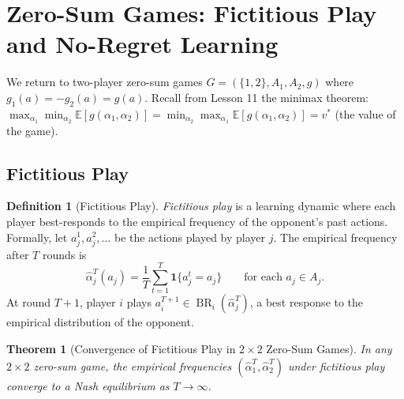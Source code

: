 \documentclass[11pt,a4paper]{article}
\theoremstyle{definition}
\newtheorem{definition}{Definition}[section]
\theoremstyle{plain}
\newtheorem{theorem}{Theorem}[section]
\theoremstyle{remark}
\newcommand{\E}{\mathbb{E}}
\newcommand{\indicator}{\mathbf{1}}
\DeclareMathOperator{\BR}{BR}
\begin{document}
\section{Zero-Sum Games: Fictitious Play and No-Regret Learning}
\label{sec:zero-sum}

We return to two-player zero-sum games $G = (\{1,2\}, A_1, A_2, g)$ where
$g_1(a) = -g_2(a) = g(a)$. Recall from Lesson 11 the minimax theorem:
$\max_{\alpha_1} \min_{\alpha_2} \E[g(\alpha_1, \alpha_2)]
= \min_{\alpha_2} \max_{\alpha_1} \E[g(\alpha_1, \alpha_2)] = v^*$ (the value of the game).

\subsection{Fictitious Play}

\begin{definition}[Fictitious Play]
\label{def:fictitious-play}
\emph{Fictitious play} is a learning dynamic where each player best-responds to the
empirical frequency of the opponent's past actions. Formally, let $a_j^1, a_j^2, \ldots$
be the actions played by player $j$. The empirical frequency after $T$ rounds is
\[
    \hat{\alpha}_j^T(a_j) = \frac{1}{T} \sum_{t=1}^T \indicator\{a_j^t = a_j\}
    \qquad \text{for each } a_j \in A_j.
\]
At round $T+1$, player $i$ plays $a_i^{T+1} \in \BR_i(\hat{\alpha}_j^T)$, a best response
to the empirical distribution of the opponent.
\end{definition}

\begin{theorem}[Convergence of Fictitious Play in $2 \times 2$ Zero-Sum Games]
\label{thm:fp-2x2}
In any $2 \times 2$ zero-sum game, the empirical frequencies
$(\hat{\alpha}_1^T, \hat{\alpha}_2^T)$ under fictitious play converge to a Nash equilibrium
as $T \to \infty$.
\end{theorem}
\end{document}
